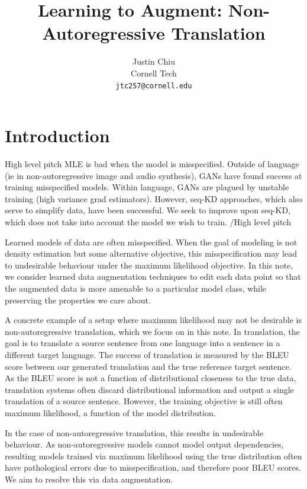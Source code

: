 \documentclass[11pt]{article}
\title{Learning to Augment: Non-Autoregressive Translation}
\author{Justin Chiu \\
  Cornell Tech \\
  \texttt{jtc257@cornell.edu}}
\begin{document}
\maketitle
\begin{abstract}
\end{abstract}

\section{Introduction}
{\color{red}High level pitch}
MLE is bad when the model is misspecified.
Outside of language (ie in non-autoregressive image and audio synthesis),
GANs have found success at training misspecified models.
Within language, GANs are plagued by unstable training (high variance grad estimators).
However, seq-KD approaches, which also serve to simplify data, have been successful.
We seek to improve upon seq-KD, which does not take into account the model we wish to train.
{\color{red}/High level pitch}

Learned models of data are often misspecified.
When the goal of modeling is not density estimation
but some alternative objective, this misspecification may lead to undesirable
behaviour under the maximum likelihood objective.
In this note, we consider learned data augmentation techniques to edit
each data point so that the augmented data is more amenable to a particular model class,
while preserving the properties we care about.

A concrete example of a setup where maximum likelihood may not be desirable is
non-autoregressive translation, which we focus on in this note.
In translation, the goal is to translate a source sentence from one language
into a sentence in a different target language.
The success of translation is measured by the BLEU score
between our generated translation and the true reference target sentence.
As the BLEU score is not a function of distributional closeness to the true data,
translation systems often discard distributional information and
output a single translation of a source sentence.
However, the training objective is still often maximum likelihood, a function of
the model distribution.

In the case of non-autoregressive translation, this results in undesirable behaviour.
As non-autoregressive models cannot model output dependencies,
resulting models trained via maximum likelihood using the true distribution
often have pathological errors due to misspecification,
and therefore poor BLEU scores.
We aim to resolve this via data augmentation.
\end{document}
